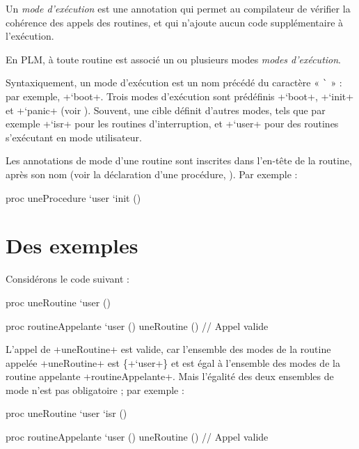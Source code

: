 





Un \emph{mode d'exécution} est une annotation qui permet au compilateur de vérifier la cohérence des appels des routines, et qui n'ajoute aucun code supplémentaire à l'exécution.

En PLM, à toute routine est associé un ou plusieurs modes \emph{modes d'exécution}.

Syntaxiquement, un mode d'exécution est un nom précédé du caractère « \texttt{\`} » : par exemple, \plm+`boot+. Trois modes d'exécution sont prédéfinis \plm+`boot+, \plm+`init+ et \plm+`panic+ (voir ). Souvent, une cible définit d'autres modes, tels que par exemple \plm+`isr+ pour les routines d'interruption, et \plm+`user+ pour des routines s'exécutant en mode utilisateur.

Les annotations de mode d'une routine sont inscrites dans l'en-tête de la routine, après son nom (voir la déclaration d'une procédure, ). Par exemple :

\begin{PLM}
proc uneProcedure `user `init () {
}
\end{PLM}


\section{Des exemples}

Considérons le code suivant :
\begin{PLM}
proc uneRoutine `user () {
}

proc routineAppelante `user () {
  uneRoutine () // Appel valide
}
\end{PLM}

L'appel de \plm+uneRoutine+ est valide, car l'ensemble des modes de la routine appelée \plm+uneRoutine+ est \{\plm+`user+\} et est égal à l'ensemble des modes de la routine appelante \plm+routineAppelante+. Mais l'égalité des deux ensembles de mode n'est pas obligatoire ; par exemple :

\begin{PLM}
proc uneRoutine `user `isr () {
}

proc routineAppelante `user () {
  uneRoutine () // Appel valide
}
\end{PLM}


